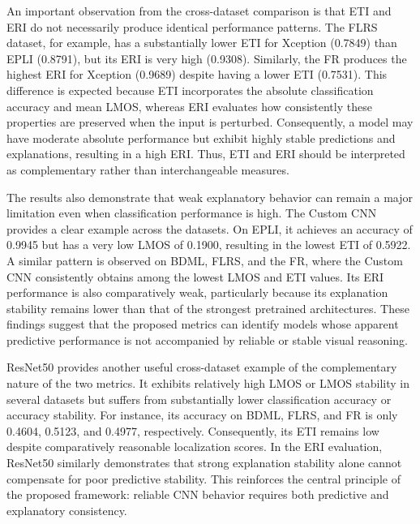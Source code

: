 \documentclass[a4paper,fleqn]{cas-dc}
\begin{document}
An important observation from the cross-dataset comparison is that ETI and ERI do not necessarily produce identical performance patterns. The FLRS dataset, for example, has a substantially lower ETI for Xception (0.7849) than EPLI (0.8791), but its ERI is very high (0.9308). Similarly, the FR produces the highest ERI for Xception (0.9689) despite having a lower ETI (0.7531). This difference is expected because ETI incorporates the absolute classification accuracy and mean LMOS, whereas ERI evaluates how consistently these properties are preserved when the input is perturbed. Consequently, a model may have moderate absolute performance but exhibit highly stable predictions and explanations, resulting in a high ERI. Thus, ETI and ERI should be interpreted as complementary rather than interchangeable measures.

The results also demonstrate that weak explanatory behavior can remain a major limitation even when classification performance is high. The Custom CNN provides a clear example across the datasets. On EPLI, it achieves an accuracy of 0.9945 but has a very low LMOS of 0.1900, resulting in the lowest ETI of 0.5922. A similar pattern is observed on BDML, FLRS, and the FR, where the Custom CNN consistently obtains among the lowest LMOS and ETI values. Its ERI performance is also comparatively weak, particularly because its explanation stability remains lower than that of the strongest pretrained architectures. These findings suggest that the proposed metrics can identify models whose apparent predictive performance is not accompanied by reliable or stable visual reasoning.

ResNet50 provides another useful cross-dataset example of the complementary nature of the two metrics. It exhibits relatively high LMOS or LMOS stability in several datasets but suffers from substantially lower classification accuracy or accuracy stability. For instance, its accuracy on BDML, FLRS, and FR is only 0.4604, 0.5123, and 0.4977, respectively. Consequently, its ETI remains low despite comparatively reasonable localization scores. In the ERI evaluation, ResNet50 similarly demonstrates that strong explanation stability alone cannot compensate for poor predictive stability. This reinforces the central principle of the proposed framework: reliable CNN behavior requires both predictive and explanatory consistency.
\end{document}
